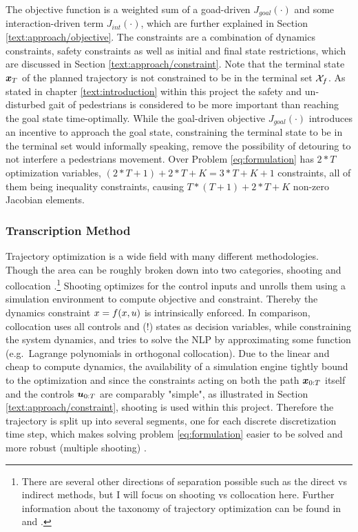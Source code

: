 The objective function is a weighted sum of a goad-driven $J_{goal}(\cdot)$ and some interaction-driven term $J_{int}(\cdot)$, which are further explained in Section \ref{text:approach/objective}. The constraints are a combination of dynamics constraints, safety constraints as well as initial and final state restrictions, which are discussed in Section \ref{text:approach/constraint}. Note that the terminal state $\boldsymbol{x}_T$ of the planned trajectory is not constrained to be in the terminal set $\mathcal{X}_f$. As stated in chapter \ref{text:introduction} within this project the safety and un-disturbed gait of pedestrians is considered to be more important than reaching the goal state time-optimally. While the goal-driven objective $J_{goal}(\cdot)$ introduces an incentive to approach the goal state, constraining the terminal state to be in the terminal set would informally speaking, remove the possibility of detouring to not interfere a pedestrians movement. 
\newline
Over Problem \ref{eq:formulation} has $2*T$ optimization variables, $(2*T + 1) + 2*T + K = 3*T + K + 1$ constraints, all of them being inequality constraints, causing $T * (T+1) + 2*T + K$ non-zero Jacobian elements.

\subsubsection{Transcription Method} 
Trajectory optimization is a wide field with many different methodologies. Though the area can be roughly broken down into two categories, shooting and collocation \cite{Kelly2017}.\footnote{There are several other directions of separation possible such as the direct vs indirect methods, but I will focus on shooting vs collocation here. Further information about the taxonomy of trajectory optimization can be found in \cite{Kelly2017} and \cite{Chai2020}.} Shooting optimizes for the control inputs and unrolls them using a simulation environment to compute objective and constraint. Thereby the dynamics constraint $x = f(x, u)$ is intrinsically enforced. In comparison, collocation uses all controls and (!) states as decision variables, while constraining the system dynamics, and tries to solve the \ac{NLP} by approximating some function (e.g.\ Lagrange polynomials in orthogonal collocation). Due to the linear and cheap to compute dynamics, the availability of a simulation engine tightly bound to the optimization and since the constraints acting on both the path $\boldsymbol{x}_{0:T}$ itself and the controls $\boldsymbol{u}_{0:T}$ are comparably "simple", as illustrated in Section \ref{text:approach/constraint}, shooting is used within this project. Therefore the trajectory is split up into several segments, one for each discrete discretization time step, which makes solving problem \ref{eq:formulation} easier to be solved and more robust (multiple shooting) \cite{Betts1998}.

